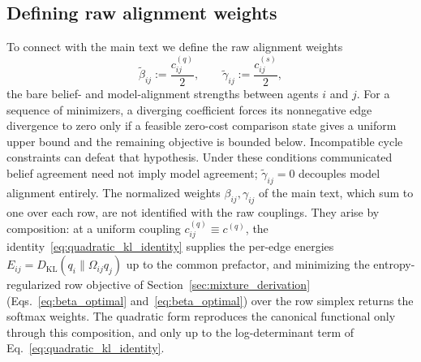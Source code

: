 \subsection{Defining raw alignment weights}
\label{sec:raw_alignment_weights}
To connect with the main text we define the raw alignment weights
\begin{equation}
\tilde\beta_{ij}:=\frac{c^{(q)}_{ij}}{2},
\qquad
\tilde\gamma_{ij}:=\frac{c^{(s)}_{ij}}{2},
\end{equation}
the bare belief- and model-alignment strengths between agents $i$ and $j$. For a sequence of minimizers, a diverging coefficient forces its nonnegative edge divergence to zero only if a feasible zero-cost comparison state gives a uniform upper bound and the remaining objective is bounded below. Incompatible cycle constraints can defeat that hypothesis. Under these conditions communicated belief agreement need not imply model agreement; $\tilde\gamma_{ij} = 0$ decouples model alignment entirely. The normalized weights $\beta_{ij}, \gamma_{ij}$ of the main text, which sum to one over each row, are not identified with the raw couplings. They arise by composition: at a uniform coupling $c^{(q)}_{ij} \equiv c^{(q)}$, the identity~\eqref{eq:quadratic_kl_identity} supplies the per-edge energies $E_{ij} = D_{\mathrm{KL}}(q_i \| \Omega_{ij}q_j)$ up to the common prefactor, and minimizing the entropy-regularized row objective of Section~\ref{sec:mixture_derivation} (Eqs.~\eqref{eq:beta_optimal} and~\eqref{eq:beta_optimal}) over the row simplex returns the softmax weights. The quadratic form reproduces the canonical functional only through this composition, and only up to the log-determinant term of Eq.~\eqref{eq:quadratic_kl_identity}.

